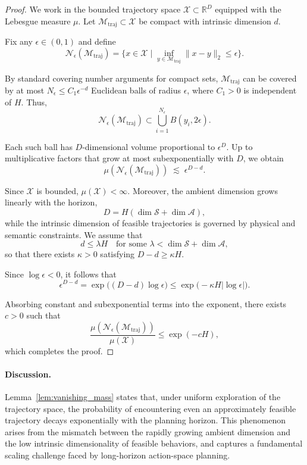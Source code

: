 \begin{proof}
We work in the bounded trajectory space
$\mathcal{X} \subset \mathbb{R}^D$
equipped with the Lebesgue measure $\mu$.
Let $\mathcal{M}_{\mathrm{traj}} \subset \mathcal{X}$ be compact
with intrinsic dimension $d$.

Fix any $\epsilon \in (0,1)$ and define
\[
\mathcal{N}_\epsilon(\mathcal{M}_{\mathrm{traj}})
=
\{x \in \mathcal{X} \mid \inf_{y \in \mathcal{M}_{\mathrm{traj}}}
\|x-y\|_2 \le \epsilon \}.
\]

By standard covering number arguments for compact sets,
$\mathcal{M}_{\mathrm{traj}}$ can be covered by at most
$N_\epsilon \le C_1 \epsilon^{-d}$ Euclidean balls of radius $\epsilon$,
where $C_1 > 0$ is independent of $H$.
Thus,
\[
\mathcal{N}_\epsilon(\mathcal{M}_{\mathrm{traj}})
\subset
\bigcup_{i=1}^{N_\epsilon} B(y_i, 2\epsilon).
\]

Each such ball has $D$-dimensional volume proportional to $\epsilon^D$.
Up to multiplicative factors that grow at most subexponentially with $D$,
we obtain
\[
\mu(\mathcal{N}_\epsilon(\mathcal{M}_{\mathrm{traj}}))
\;\lesssim\;
\epsilon^{D-d}.
\]

Since $\mathcal{X}$ is bounded, $\mu(\mathcal{X}) < \infty$.
Moreover, the ambient dimension grows linearly with the horizon,
\[
D = H(\dim \mathcal{S} + \dim \mathcal{A}),
\]
while the intrinsic dimension of feasible trajectories is governed by
physical and semantic constraints.
We assume that
\[
d \le \lambda H
\quad \text{for some } \lambda < \dim \mathcal{S} + \dim \mathcal{A},
\]
so that there exists $\kappa > 0$ satisfying $D - d \ge \kappa H$.

Since $\log \epsilon < 0$, it follows that
\[
\epsilon^{D-d}
=
\exp\!\big((D-d)\log \epsilon\big)
\le
\exp\!\big(-\kappa H |\log \epsilon|\big).
\]

Absorbing constant and subexponential terms into the exponent,
there exists $c>0$ such that
\[
\frac{\mu(\mathcal{N}_\epsilon(\mathcal{M}_{\mathrm{traj}}))}{\mu(\mathcal{X})}
\le \exp(-cH),
\]
which completes the proof.
\end{proof}

\paragraph{Discussion.}
Lemma~\ref{lem:vanishing_mass} states that,
under uniform exploration of the trajectory space,
the probability of encountering even an approximately feasible trajectory
decays exponentially with the planning horizon.
This phenomenon arises from the mismatch between the rapidly growing ambient dimension
and the low intrinsic dimensionality of feasible behaviors,
and captures a fundamental scaling challenge faced by long-horizon
action-space planning.

